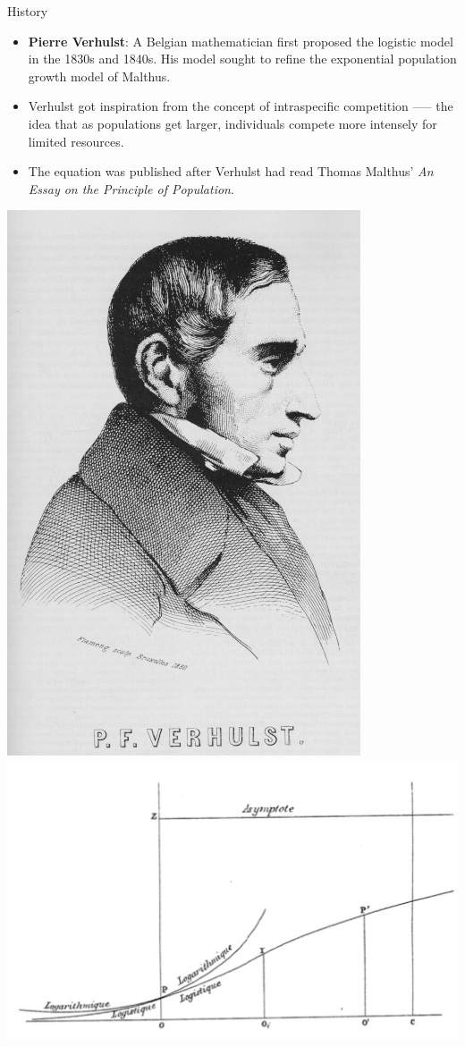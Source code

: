 \begin{frame}{History}
\small
    \begin{itemize}
    \item \textbf{Pierre Verhulst}: A Belgian mathematician first proposed the logistic model in the 1830s and 1840s. His model sought to refine the exponential population growth model of Malthus.
        \pause
    \item  Verhulst got inspiration from the concept of intraspecific competition —-- the idea that as populations get larger, individuals compete more intensely for limited resources.
        \pause
    \item The  equation was published after Verhulst had read Thomas Malthus' \textit{An Essay on the Principle of Population}.
    \end{itemize}
    \begin{center}
    \includegraphics[scale = 0.15]{lesson_1/images/logistic_model_verhulst.jpg}
    \hspace{1em}
    \includegraphics[scale = 0.2]{lesson_1/images/logistic_model_historical.png}

\end{center}
\end{frame}
